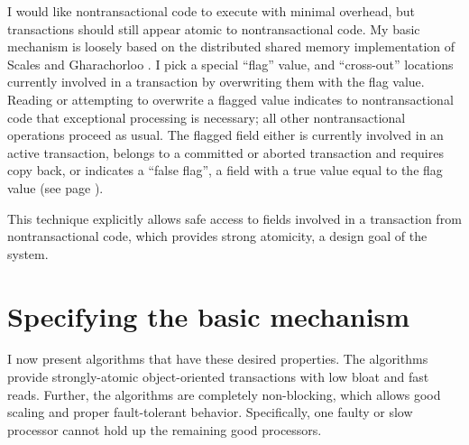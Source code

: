 I would like nontransactional code to execute with minimal overhead,
but transactions should still appear atomic to nontransactional
code.  My basic mechanism is loosely based on the
distributed shared memory implementation of Scales and Gharachorloo
\cite{ScalesGh97}.  I pick a special ``flag'' value, and
``cross-out'' locations currently involved in a transaction by
overwriting them with the flag value.  Reading or attempting to
overwrite a flagged value indicates to nontransactional code
that exceptional processing is necessary; all other nontransactional
operations proceed as usual.  The flagged field either is currently
involved in an active transaction, belongs to a committed or aborted
transaction and requires copy back, or indicates a ``false flag'', a
field with a true value equal to the flag value (see
page \pageref{pg:falseflag}).

This technique explicitly allows safe access to fields
involved in a transaction from nontransactional code, which provides
strong atomicity, a
design goal of the system.

\section{Specifying the basic mechanism}
I now present algorithms that have these desired properties.
The \apex algorithms provide strongly-atomic object-oriented
transactions with low bloat and fast reads.  Further, the \apex
algorithms are completely non-blocking, which allows good
scaling and proper fault-tolerant behavior.  Specifically, one faulty or slow
processor cannot hold up the remaining good processors.

